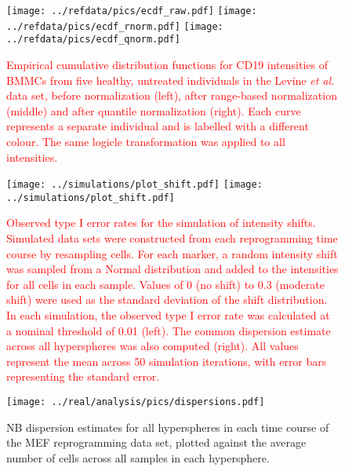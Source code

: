 \documentclass{article}
\newcommand\revised[1]{\textcolor{red}{#1}}
\begin{document}
\begin{figure}[tbp]
    \begin{center}
        \texttt{[image: ../refdata/pics/ecdf\_raw.pdf]}
        \texttt{[image: ../refdata/pics/ecdf\_rnorm.pdf]}
        \texttt{[image: ../refdata/pics/ecdf\_qnorm.pdf]}
    \end{center}
    \caption{\revised{Empirical cumulative distribution functions for CD19 intensities of BMMCs from five healthy, untreated individuals in the Levine \textit{et al.} data set, before normalization (left), after range-based normalization (middle) and after quantile normalization (right).
        Each curve represents a separate individual and is labelled with a different colour.
        The same logicle transformation was applied to all intensities.
    }
    }
    \label{fig:quantile}
\end{figure}

\begin{figure}[tbp]
    \begin{center}
        \texttt{[image: ../simulations/plot\_shift.pdf]}
        \texttt{[image: ../simulations/plot\_shift.pdf]}
    \end{center}
    \caption{\revised{Observed type I error rates for the simulation of intensity shifts.
        Simulated data sets were constructed from each reprogramming time course by resampling cells.
        For each marker, a random intensity shift was sampled from a Normal distribution and added to the intensities for all cells in each sample.
        Values of 0 (no shift) to 0.3 (moderate shift) were used as the standard deviation of the shift distribution.
        In each simulation, the observed type I error rate was calculated at a nominal threshold of 0.01 (left).
        The common dispersion estimate across all hyperspheres was also computed (right).
        All values represent the mean across 50 simulation iterations, with error bars representing the standard error.
    }
}
\label{fig:shift_sim}
\end{figure}

\begin{figure}[tbp]
    \begin{center}
    \texttt{[image: ../real/analysis/pics/dispersions.pdf]}
    \end{center}
    \caption{NB dispersion estimates for all hyperspheres in each time course of the MEF reprogramming data set, plotted against the average number of cells across all samples in each hypersphere.}
\end{figure}
\end{document}
